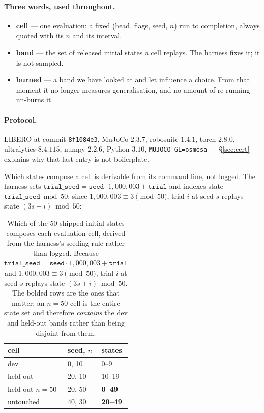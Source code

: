 \documentclass[10pt,twocolumn]{article}
\begin{document}
\paragraph{Three words, used throughout.}
\begin{itemize}\itemsep1pt \parskip0pt  
\item \textbf{cell} --- one evaluation: a fixed (head, flags, seed, $n$) run to
completion, always quoted with its $n$ and its interval.
\item \textbf{band} --- the set of released initial states a cell replays. The
harness fixes it; it is not sampled.
\item \textbf{burned} --- a band we have looked at and let influence a choice.
From that moment it no longer measures generalisation, and no amount of
re-running un-burns it.
\end{itemize}

\paragraph{Protocol.} LIBERO at commit \texttt{8f1084e3}, MuJoCo $2.3.7$,
robosuite $1.4.1$, torch $2.8.0$, ultralytics $8.4.115$, numpy $2.2.6$,
Python $3.10$, \texttt{MUJOCO\_GL=osmesa} --- \S\ref{sec:cert} explains why
that last entry is not boilerplate.

Which states compose a cell is derivable from its command line, not logged.
The harness sets $\texttt{trial\_seed} = \texttt{seed}\cdot 1{,}000{,}003 +
\texttt{trial}$ and indexes state $\texttt{trial\_seed} \bmod 50$; since
$1{,}000{,}003 \equiv 3 \pmod{50}$, trial $i$ at seed $s$ replays state
$(3s+i) \bmod 50$:

\begin{table}[h]\centering\small
\begin{tabular}{lll}
\toprule
cell & seed, $n$ & states \\
\midrule
dev & 0, 10 & 0--9 \\
held-out & 20, 10 & 10--19 \\
held-out $n{=}50$ & 20, 50 & \textbf{0--49} \\
untouched & 40, 30 & \textbf{20--49} \\
\bottomrule
\end{tabular}
\caption{Which of the $50$ shipped initial states composes each evaluation
cell, derived from the harness's seeding rule rather than logged. Because
$\texttt{trial\_seed} = \texttt{seed}\cdot 1{,}000{,}003 + \texttt{trial}$ and
$1{,}000{,}003 \equiv 3 \pmod{50}$, trial $i$ at seed $s$ replays state
$(3s+i) \bmod 50$. The bolded rows are the ones that matter: an $n{=}50$ cell
is the entire state set and therefore \emph{contains} the dev and held-out
bands rather than being disjoint from them.}
\label{tab:bands}
\end{table}
\end{document}
